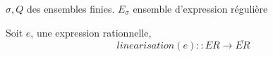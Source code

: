 \documentclass{article}
\begin{document}
\(\sigma, Q\) des ensembles finies.
\(E_\sigma\) ensemble d'expression régulière 

Soit \(e\), une expression rationnelle,
\[
  linearisation(e) :: ER \to \overline{ER}
\]
\end{document}
